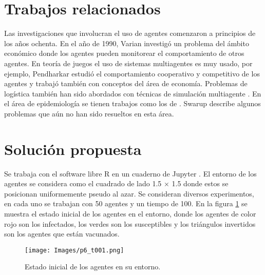 \documentclass[final,6p,times,twocolumn]{elsarticle}
\begin{document}
	
	
	\section{Trabajos relacionados}
	\label{S:trela}
	Las investigaciones que involucran el uso de agentes comenzaron a principios de los años ochenta. En el año de 1990, Varian \cite{Varian} investigó un problema del ámbito económico donde los agentes pueden monitorear el comportamiento de otros agentes. 
	En teoría de juegos el uso de sistemas multiagentes es muy usado, por ejemplo, Pendharkar  \cite{gametheoretical} estudió el comportamiento cooperativo y competitivo de los agentes y trabajó también con conceptos del área de economía. Problemas de logística también han sido abordados con técnicas de simulación multiagente \cite{Wojtusiak_Warden_Herzog_2012, horl_2017}. En el área de epidemiología se tienen trabajos como los de \citet{Perez_Dragicevic_2009, Venkatramanan_Lewis_Chen_Higdon_Vullikanti_Marathe_2018, Hoertel_Blachier_Blanco_Olfson_Massetti_Rico_Limosin_Leleu_2020}. Swarup \cite{Swarup} describe  algunos problemas que aún no han sido resueltos en esta área. 
	\section{Solución propuesta}
	\label{S:Sprop}
	Se trabaja con el software libre R \cite{R} en un cuaderno de Jupyter \cite{jupyter}. El entorno de los agentes se considera como el cuadrado de lado 1.5 $\times$ 1.5 donde estos se posicionan uniformemente pseudo al azar. Se consideran diversos experimentos, en cada uno se trabajan con 50 agentes y un tiempo de 100. En la figura \ref{paso1} se muestra el estado inicial de los agentes en el entorno, donde los agentes de color rojo son los infectados, los verdes son los susceptibles y los triángulos invertidos son los agentes que están vacunados. 
	
	\begin{figure}
		\label{paso1}
		\centering
		\texttt{[image: Images/p6\_t001.png]}
		\caption{Estado inicial de los agentes en su entorno.}
	\end{figure}
	
\end{document}
